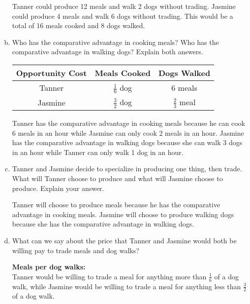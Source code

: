 \documentclass{article}
\begin{document}
\begin{enumerate}[(a)]

        Tanner could produce 12 meals and walk 2 dogs without trading. Jasmine could produce 4 meals and walk 6 dogs without trading. This would be a total of 16 meals cooked and 8 dogs walked.
\pagebreak
    \item Who has the comparative advantage in cooking meals? Who
has the comparative advantage in walking dogs? Explain both
answers.


\begin{center}
    \begin{tabular}{ |c|c|c| } 
     \hline
     Opportunity Cost & Meals Cooked & Dogs Walked \\ 
     \hline
    Tanner & \(\frac{1}{6}\) dog & 6 meals \\
    \hline
    Jasmine & \(\frac{3}{2}\) dog & \(\frac{2}{3}\) meal \\
    \hline
    \end{tabular}
\end{center}


    Tanner has the comparative advantage in cooking meals because he can cook 6 meals in an hour while Jasmine can only cook 2 meals in an hour. Jasmine has the comparative advantage in walking dogs because she can walk 3 dogs in an hour while Tanner can only walk 1 dog in an hour.

    \item Tanner and Jasmine decide to specialize in producing one thing,
then trade. What will Tanner choose to produce and what will
Jasmine choose to produce. Explain your answer.

    Tanner will choose to produce meals because he has the comparative advantage in cooking meals. Jasmine will choose to produce walking dogs because she has the comparative advantage in walking dogs.

    \item What can we say about the price that Tanner and Jasmine would
both be willing pay to trade meals and dog walks?

    \textbf{Meals per dog walks:}\\
    Tanner would be willing to trade a meal for anything more than \(\frac{1}{6}\) of a dog walk, while Jasmine would be willing to trade a meal for anything less than \(\frac{3}{2}\) of a dog walk.\\


\end{enumerate}
\end{document}
